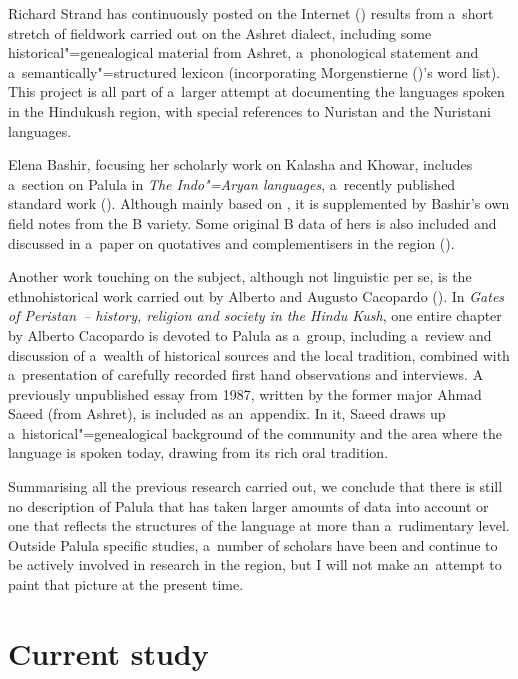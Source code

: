 Richard Strand has continuously posted on the Internet (\citeyear{strand1997/2015})
results from a~short stretch of fieldwork carried out on the Ashret dialect, including
some historical"=genealogical material from Ashret, a~phonological statement and
a~semantically"=structured lexicon (incorporating Morgenstierne (\citeyear{morgenstierne1941})'s word list). This project is
all part of a~larger attempt at documenting the languages spoken in the Hindukush region, with
special references to Nuristan and the Nuristani languages.


Elena Bashir, focusing her scholarly work on Kalasha and Khowar, includes a~section on Palula in
\textit{The Indo"=Aryan languages}, a~recently published standard work
(\citeyear{bashir2003}). Although mainly based on \citet{morgenstierne1941}, it is supplemented by
Bashir's own field notes from the B variety. Some original B data of hers is also included and
discussed in a~paper on quotatives and complementisers in the region (\citeyear{bashir1996}).


Another work touching on the subject, although not linguistic per se, is the ethnohistorical work
carried out by Alberto and Augusto Cacopardo (\citeyear{cacopardo2001}). In \textit{Gates of
  Peristan~-- history, religion and society in the Hindu Kush}, one entire chapter by Alberto
Cacopardo is devoted to Palula as a~group, including a~review and discussion of a~wealth of
historical sources and the local tradition, combined with a~presentation of carefully recorded first
hand observations and interviews. A previously unpublished essay from 1987, written by the former
major Ahmad Saeed (from Ashret), is included as an~appendix. In it, Saeed draws up
a~historical"=genealogical background of the community and the area where the language is spoken
today, drawing from its rich oral tradition.


Summarising all the previous research carried out, we conclude that there is still no description of
Palula that has taken larger amounts of data into account or one that reflects the structures of the
language at more than a~rudimentary level. Outside Palula specific studies, a~number of scholars have been and continue to be actively involved
in research in the region, but I will not make an~attempt to paint that picture at the present time.


\section{Current study}
\label{sec:1-6}

